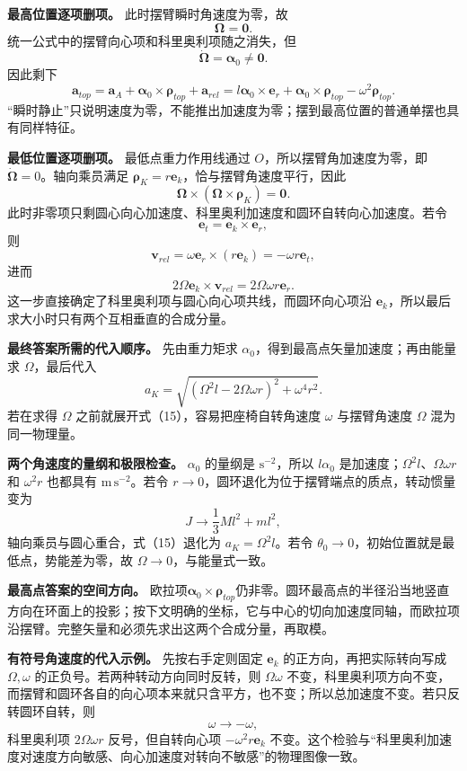 \documentclass[12pt,a4paper,UTF8]{ctexart}
\begin{document}
\textbf{最高位置逐项删项。} 此时摆臂瞬时角速度为零，故 \[
\boldsymbol\Omega=\boldsymbol0.
\] 统一公式中的摆臂向心项和科里奥利项随之消失，但 \[
\dot{\boldsymbol\Omega}=\boldsymbol\alpha_0\ne\boldsymbol0.
\] 因此剩下 \[
\boldsymbol a_{top}
=\boldsymbol a_A+\boldsymbol\alpha_0\times\boldsymbol\rho_{top}+\boldsymbol a_{rel}
=l\boldsymbol\alpha_0\times\boldsymbol e_r
+\boldsymbol\alpha_0\times\boldsymbol\rho_{top}
-\omega^2\boldsymbol\rho_{top}.
\]
``瞬时静止''只说明速度为零，不能推出加速度为零；摆到最高位置的普通单摆也具有同样特征。

\textbf{最低位置逐项删项。} 最低点重力作用线通过
\(O\)，所以摆臂角加速度为零，即
\(\dot{\boldsymbol\Omega}=0\)。轴向乘员满足
\(\boldsymbol\rho_K=r\boldsymbol e_k\)，恰与摆臂角速度平行，因此 \[
\boldsymbol\Omega\times
(\boldsymbol\Omega\times\boldsymbol\rho_K)=\boldsymbol0.
\]
此时非零项只剩圆心向心加速度、科里奥利加速度和圆环自转向心加速度。若令
\[
\boldsymbol e_t=\boldsymbol e_k\times\boldsymbol e_r,
\] 则 \[
\boldsymbol v_{rel}
=\omega\boldsymbol e_r\times
(r\boldsymbol e_k)
=-\omega r\boldsymbol e_t,
\] 进而 \[
2\Omega\boldsymbol e_k\times\boldsymbol v_{rel}
=2\Omega\omega r\boldsymbol e_r.
\] 这一步直接确定了科里奥利项与圆心向心项共线，而圆环向心项沿
\(\boldsymbol e_k\)，所以最后求大小时只有两个互相垂直的合成分量。

\textbf{最终答案所需的代入顺序。} 先由重力矩求
\(\alpha_0\)，得到最高点矢量加速度；再由能量求 \(\Omega\)，最后代入 \[
a_K=\sqrt{(\Omega^2l-2\Omega\omega r)^2+\omega^4r^2}.
\] 若在求得 \(\Omega\) 之前就展开式（15），容易把座椅自转角速度
\(\omega\) 与摆臂角速度 \(\Omega\) 混为同一物理量。

\textbf{两个角速度的量纲和极限检查。} \(\alpha_0\) 的量纲是
\(\mathrm{s^{-2}}\)，所以 \(l\alpha_0\)
是加速度；\(\Omega^2l\)、\(\Omega\omega r\) 和 \(\omega^2r\) 也都具有
\(\mathrm{m\,s^{-2}}\)。若令
\(r\to0\)，圆环退化为位于摆臂端点的质点，转动惯量变为 \[
J\to\frac13Ml^2+ml^2,
\] 轴向乘员与圆心重合，式（15）退化为 \(a_K=\Omega^2l\)。若令
\(\theta_0\to0\)，初始位置就是最低点，势能差为零，故
\(\Omega\to0\)，与能量式一致。

\textbf{最高点答案的空间方向。}
欧拉项\(\boldsymbol\alpha_0\times\boldsymbol\rho_{top}\)仍非零。圆环最高点的半径沿当地竖直方向在环面上的投影；按下文明确的坐标，它与中心的切向加速度同轴，而欧拉项沿摆臂。完整矢量和必须先求出这两个合成分量，再取模。

\textbf{有符号角速度的代入示例。} 先按右手定则固定 \(\boldsymbol e_k\)
的正方向，再把实际转向写成 \(\Omega,\omega\)
的正负号。若两种转动方向同时反转，则 \(\Omega\omega\)
不变，科里奥利项方向不变，而摆臂和圆环各自的向心项本来就只含平方，也不变；所以总加速度不变。若只反转圆环自转，则
\[
\omega\to-\omega,
\] 科里奥利项 \(2\Omega\omega r\) 反号，但自转向心项
\(-\omega^2r\boldsymbol e_k\)
不变。这个检验与``科里奥利加速度对速度方向敏感、向心加速度对转向不敏感''的物理图像一致。
\end{document}
